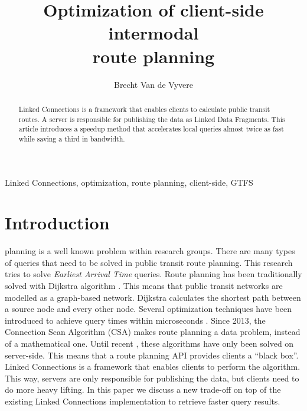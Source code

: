 \documentclass[twocolumn]{phdsymp} %
\begin{document}
\title{Optimization of client-side intermodal \\route planning} %

\author{Brecht Van de Vyvere}


\maketitle

\begin{abstract}
Linked Connections is a framework that enables clients to calculate public transit routes. A server is responsible for publishing the data as Linked Data Fragments. This article introduces a speedup method that accelerates local queries almost twice as fast while saving a third in bandwidth.
\end{abstract}

\begin{keywords}
Linked Connections, optimization, route planning, client-side, GTFS
\end{keywords}

\section{Introduction}
 planning is a well known problem within research groups. There are many types of queries that need to be solved in public transit route planning. This research tries to solve \textit{Earliest Arrival Time} queries. Route planning has been traditionally solved with Dijkstra algorithm \cite{raptor}. This means that public transit networks are modelled as a graph-based network. Dijkstra calculates the shortest path between a source node and every other node. Several optimization techniques have been introduced to achieve query times within microseconds \cite{scalable-transfer-patterns}. Since 2013, the Connection Scan Algorithm (CSA) \cite{csa} makes route planning a data problem, instead of a mathematical one. Until recent \cite{colpaert_iswc_2015}, these algorithms have only been solved on server-side. This means that a route planning API provides clients a ``black box''. Linked Connections is a framework that enables clients to perform the algorithm. This way, servers are only responsible for publishing the data, but clients need to do more heavy lifting. In this paper we discuss a new trade-off on top of the existing Linked Connections implementation to retrieve faster query results.
\end{document}
